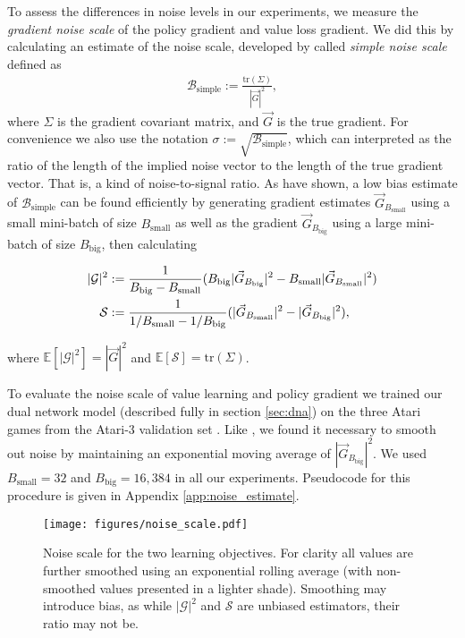 \documentclass{article}
\newcommand{\gbs}[0]{\ensuremath{\vec{G}_{B_{\text{small}}}}\xspace}
\newcommand{\gbl}[0]{\ensuremath{\vec{G}_{B_{\text{big}}}}\xspace}
\newcommand{\bbs}[0]{\ensuremath{{B_{\text{small}}}}\xspace}
\newcommand{\bbb}[0]{\ensuremath{{B_{\text{big}}}}\xspace}
\newcommand{\bs}[0]{\ensuremath{\mathcal{B}_\text{simple}}\xspace}
\begin{document}
To assess the differences in noise levels in our experiments, we measure the \textit{gradient noise scale} of the policy gradient and value loss gradient. We did this by calculating an estimate of the noise scale, developed by \cite{mccandlish2018empirical} called \textit{simple noise scale} defined as
\begin{align}
    \bs := \frac{\text{tr}(\Sigma)}{|\vec{G}|^2},
\end{align}
where $\Sigma$ is the gradient covariant matrix, and $\vec{G}$ is the true gradient. For convenience we also use the notation $\sigma := \sqrt{\bs}$, which can interpreted as the ratio of the length of the implied noise vector to the length of the true gradient vector. That is, a kind of noise-to-signal ratio. As \cite{mccandlish2018empirical} have shown, a low bias  estimate of \bs can be found efficiently by generating gradient estimates \gbs using a small mini-batch of size \bbs as well as the gradient \gbl using a large mini-batch of size \bbb, then calculating

\begin{align}
     |\mathcal{G}|^2 &:= \frac{1}{\bbb - \bbs}\large(  \bbb |\gbl|^2 - \bbs |\gbs|^2   \large) \\
     \mathcal{S} &:= \frac{1}{1/\bbs - 1/ \bbb} \large( |\gbs|^2 - |\gbl|^2   \large),
\end{align}

where $\mathbb{E}[|\mathcal{G}|^2] = |\vec{G}|^2$ and $\mathbb{E}[\mathcal{S}] = \text{tr}(\Sigma)$. 


To evaluate the noise scale of value learning and policy gradient we trained our dual network model (described fully in section \ref{sec:dna}) on the three Atari games from the Atari-3 validation set \cite{aitchison2022atari}. Like \cite{mccandlish2018empirical}, we found it necessary to smooth out noise by maintaining an exponential moving average of $|\gbl|^2$. We used $\bbs=32$ and $\bbb=16,384$ in all our experiments. Pseudocode for this procedure is given in Appendix \ref{app:noise_estimate}.



\begin{figure}[t]
    \centering
    \texttt{[image: figures/noise\_scale.pdf]}
    \caption{Noise scale for the two learning objectives. For clarity all values are further smoothed using an exponential rolling average (with non-smoothed values presented in a lighter shade). Smoothing may introduce bias, as while $|\mathcal{G}|^2$ and $\mathcal{S}$ are unbiased estimators, their ratio may not be.}
    \label{fig:noise_scale}
\end{figure}
\end{document}
